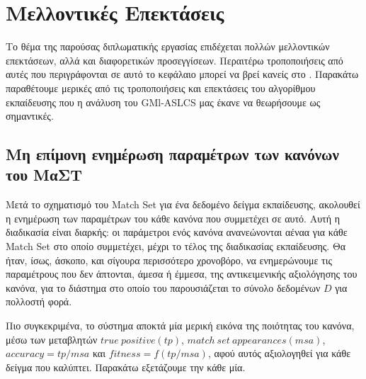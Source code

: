 \chapter{Μελλοντικές Επεκτάσεις}
\label{futureWork}
Το θέμα της παρούσας διπλωματικής εργασίας επιδέχεται πολλών μελλοντικών επεκτάσεων, αλλά και
διαφορετικών προσεγγίσεων. Περαιτέρω τροποποιήσεις από αυτές που περιγράφονται σε αυτό το κεφάλαιο μπορεί να βρεί κανείς στο \cite{allamanis11}. Παρακάτω παραθέτουμε μερικές από τις τροποποιήσεις και επεκτάσεις του αλγορίθμου εκπαίδευσης που η ανάλυση του GMl-ASLCS μας έκανε να θεωρήσουμε ως σημαντικές.

\section{Μη επίμονη ενημέρωση παραμέτρων των κανόνων του ΜαΣΤ}
Μετά το σχηματισμό του Match Set για ένα δεδομένο δείγμα εκπαίδευσης, ακολουθεί η ενημέρωση των παραμέτρων του κάθε κανόνα που συμμετέχει σε αυτό. Αυτή η διαδικασία είναι διαρκής: οι παράμετροι ενός κανόνα ανανεώνονται αέναα για κάθε Match Set στο οποίο συμμετέχει, μέχρι το τέλος της διαδικασίας εκπαίδευσης. Θα ήταν, ίσως, άσκοπο, και σίγουρα περισσότερο χρονοβόρο, να ενημερώνουμε τις παραμέτρους που δεν άπτονται, άμεσα ή έμμεσα, της αντικειμενικής αξιολόγησης του κανόνα, για το διάστημα στο οποίο του παρουσιάζεται το σύνολο δεδομένων $D$ για πολλοστή φορά. 

Πιο συγκεκριμένα, το σύστημα αποκτά μία μερική εικόνα της ποιότητας του κανόνα, μέσω των μεταβλητών
$true \:positive (tp)$, $match \:set \: appearances (msa)$, $accuracy = tp / msa$ και $fitness = f(tp/msa)$, αφού αυτός αξιολογηθεί για κάθε δείγμα που καλύπτει. Παρακάτω εξετάζουμε την κάθε μία.


